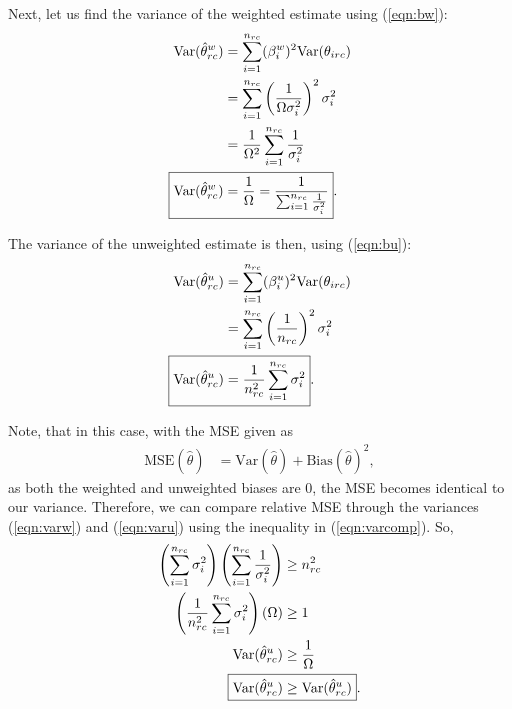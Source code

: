 \documentclass[12pt]{article}
\begin{document}
\begin{enumerate}[label=(\alph*)]
    Next, let us find the variance of the weighted estimate using (\ref{eqn:bw}):
    \begin{align}
        \text{Var}(\hat\theta_{rc}^w)&=\sum_{i=1}^{n_{rc}}(\beta_i^w)^2\text{Var}(\theta_{irc})\nonumber\\
        &=\sum_{i=1}^{n_{rc}}\left(\frac{1}{\Omega\sigma_i^2}\right)^2\sigma_i^2\nonumber\\
        &=\frac{1}{\Omega^2}\sum_{i=1}^{n_{rc}}\frac{1}{\sigma_i^2}\nonumber\\
        \Aboxed{\text{Var}(\hat\theta_{rc}^w)&=\frac{1}{\Omega}=\frac{1}{\sum_{i=1}^{n_{rc}}\frac{1}{\sigma_i^2}}}.\label{eqn:varw}
    \end{align}

    The variance of the unweighted estimate is then, using (\ref{eqn:bu}):
    \begin{align}
        \text{Var}(\hat\theta_{rc}^u)&=\sum_{i=1}^{n_{rc}}(\beta_i^u)^2\text{Var}(\theta_{irc})\nonumber\\
        &=\sum_{i=1}^{n_{rc}}\left(\frac{1}{n_{rc}}\right)^2\sigma_i^2\nonumber\\
        \Aboxed{\text{Var}(\hat\theta_{rc}^u)&=\frac{1}{n_{rc}^2}\sum_{i=1}^{n_{rc}}\sigma_i^2}.\label{eqn:varu}
    \end{align}

    Note, that in this case, with the MSE given as
    \begin{align}
        \text{MSE}(\hat\theta)&=\text{Var}(\hat\theta)+\text{Bias}(\hat\theta)^2,
    \end{align}
    as both the weighted and unweighted biases are 0, the MSE becomes identical to our variance. Therefore, we can compare relative MSE through the variances (\ref{eqn:varw}) and (\ref{eqn:varu}) using the inequality in (\ref{eqn:varcomp}). So,
    \begin{align*}
        \left(\sum_{i=1}^{n_{rc}}\sigma_i^2\right)\left(\sum_{i=1}^{n_{rc}}\frac{1}{\sigma_i^2}\right)&\geq n_{rc}^2\\
        \left(\frac{1}{n_{rc}^2}\sum_{i=1}^{n_{rc}}\sigma_i^2\right)(\Omega)&\geq 1\\
        \text{Var}(\hat\theta_{rc}^u)&\geq\frac{1}{\Omega}\\
        \Aboxed{\text{Var}(\hat\theta_{rc}^u)&\geq\text{Var}(\hat\theta_{rc}^u)}.
    \end{align*}


\end{enumerate}
\end{document}
